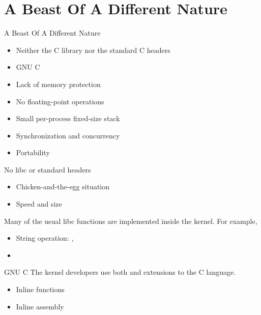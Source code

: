 \section{A Beast Of A Different Nature}

\begin{frame}{A Beast Of A Different Nature}
  \begin{itemize}
  \item Neither the C library nor the standard C headers
  \item GNU C
  \item Lack of memory protection
  \item No floating-point operations
  \item Small per-process fixed-size stack
  \item Synchronization and concurrency
  \item Portability
  \end{itemize}
\end{frame}

\begin{frame}
  \begin{block}{No libc or standard headers}
    \begin{itemize}
    \item Chicken-and-the-egg situation
    \item Speed and size
    \end{itemize}
    Many of the usual libc functions are implemented inside the kernel. For example,
    \begin{itemize}
    \item String operation: , 
    \item {}
    \end{itemize}
  \end{block}
\end{frame}

\begin{frame}{GNU C}
  The kernel developers use both  and  extensions to the C
  language.
  \begin{itemize}
  \item Inline functions
  \item Inline assembly
  \end{itemize}
\end{frame}

